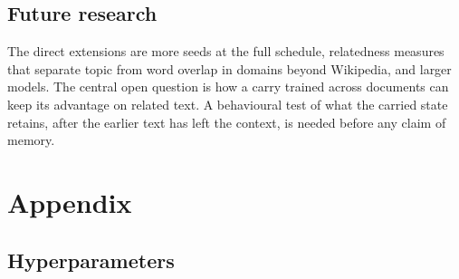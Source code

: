 \documentclass[12pt,a4paper]{report}
\begin{document}
\section{Future research}

The direct extensions are more seeds at the full schedule, relatedness measures that separate topic from word overlap in domains beyond Wikipedia, and larger models. The central open question is how a carry trained across documents can keep its advantage on related text. A behavioural test of what the carried state retains, after the earlier text has left the context, is needed before any claim of memory.


\cleardoublepage
{}
{}



\chapter*{Appendix}
{}
\setcounter{section}{0}
\renewcommand{\thesection}{A.\arabic{section}}
\renewcommand{\theHsection}{A.\arabic{section}}
\setcounter{table}{0}
\renewcommand{\thetable}{A.\arabic{table}}

\section{Hyperparameters}
\label{app-hparams}
\end{document}
